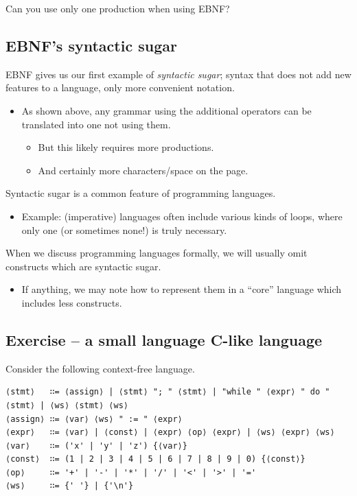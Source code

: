 \documentclass[11pt]{article}
\theoremstyle{definition}
\begin{document}
Can you use only one production when using EBNF?

\subsection{EBNF's syntactic sugar}
\label{sec:orgfcc7fee}

EBNF gives us our first example of \emph{syntactic sugar};
syntax that does not add new features to a language,
only more convenient notation.
\begin{itemize}
\item As shown above, any grammar using the additional operators
can be translated into one not using them.
\begin{itemize}
\item But this likely requires more productions.
\item And certainly more characters/space on the page.
\end{itemize}
\end{itemize}

Syntactic sugar is a common feature of programming languages.
\begin{itemize}
\item Example: (imperative) languages often include various kinds of loops,
where only one (or sometimes none!) is truly necessary.
\end{itemize}

When we discuss programming languages formally,
we will usually omit constructs which are syntactic sugar.
\begin{itemize}
\item If anything, we may note how to represent them
in a “core” language which includes less constructs.
\end{itemize}

\subsection{Exercise – a small language C-like language}
\label{sec:orgdb9fc01}

Consider the following context-free language.
\begin{verbatim}
⟨stmt⟩   ∷= ⟨assign⟩ | ⟨stmt⟩ "; " ⟨stmt⟩ | "while " ⟨expr⟩ " do " ⟨stmt⟩ | ⟨ws⟩ ⟨stmt⟩ ⟨ws⟩
⟨assign⟩ ∷= ⟨var⟩ ⟨ws⟩ " := " ⟨expr⟩
⟨expr⟩   ∷= ⟨var⟩ | ⟨const⟩ | ⟨expr⟩ ⟨op⟩ ⟨expr⟩ | ⟨ws⟩ ⟨expr⟩ ⟨ws⟩
⟨var⟩    ∷= ('x' | 'y' | 'z') {⟨var⟩}
⟨const⟩  ∷= (1 | 2 | 3 | 4 | 5 | 6 | 7 | 8 | 9 | 0) {⟨const⟩}
⟨op⟩     ∷= '+' | '-' | '*' | '/' | '<' | '>' | '='
⟨ws⟩     ∷= {' '} | {'\n'}
\end{verbatim}
\end{document}
